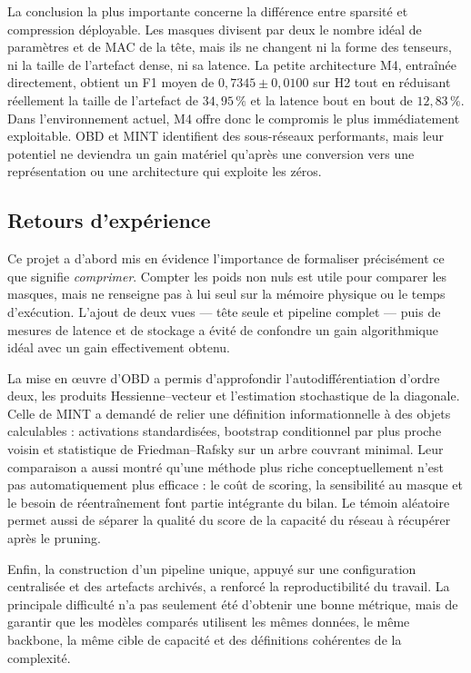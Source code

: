 La conclusion la plus importante concerne la différence entre sparsité et
compression déployable. Les masques divisent par deux le nombre idéal de
paramètres et de MAC de la tête, mais ils ne changent ni la forme des tenseurs,
ni la taille de l'artefact dense, ni sa latence. La petite architecture M4,
entraînée directement, obtient un F1 moyen de $0{,}7345\pm0{,}0100$ sur H2
tout en réduisant
réellement la taille de l'artefact de $34{,}95\,\%$ et la latence bout en bout
de $12{,}83\,\%$. Dans l'environnement actuel, M4 offre donc le compromis le
plus immédiatement exploitable. OBD et MINT identifient des sous-réseaux
performants, mais leur potentiel ne deviendra un gain matériel qu'après une
conversion vers une représentation ou une architecture qui exploite les zéros.

\subsection{Retours d'expérience}
\label{ssec:conclusion_retours}

Ce projet a d'abord mis en évidence l'importance de formaliser précisément ce
que signifie \emph{comprimer}. Compter les poids non nuls est utile pour
comparer les masques, mais ne renseigne pas à lui seul sur la mémoire physique
ou le temps d'exécution. L'ajout de deux vues --- tête seule et pipeline complet
--- puis de mesures de latence et de stockage a évité de confondre un gain
algorithmique idéal avec un gain effectivement obtenu.

La mise en œuvre d'OBD a permis d'approfondir l'autodifférentiation d'ordre
deux, les produits Hessienne--vecteur et l'estimation stochastique de la
diagonale. Celle de MINT a demandé de relier une définition informationnelle à
des objets calculables : activations standardisées, bootstrap conditionnel par
plus proche voisin et statistique de Friedman--Rafsky sur un arbre couvrant
minimal. Leur comparaison a aussi montré qu'une méthode plus riche
conceptuellement n'est pas automatiquement plus efficace : le coût de scoring,
la sensibilité au masque et le besoin de réentraînement font partie intégrante
du bilan. Le témoin aléatoire permet aussi de séparer la qualité du score de la
capacité du réseau à récupérer après le pruning.

Enfin, la construction d'un pipeline unique, appuyé sur une configuration
centralisée et des artefacts archivés, a renforcé la reproductibilité du
travail. La principale difficulté n'a pas seulement été d'obtenir une bonne
métrique, mais de garantir que les modèles comparés utilisent les mêmes données,
le même backbone, la même cible de capacité et des définitions cohérentes de la
complexité.

